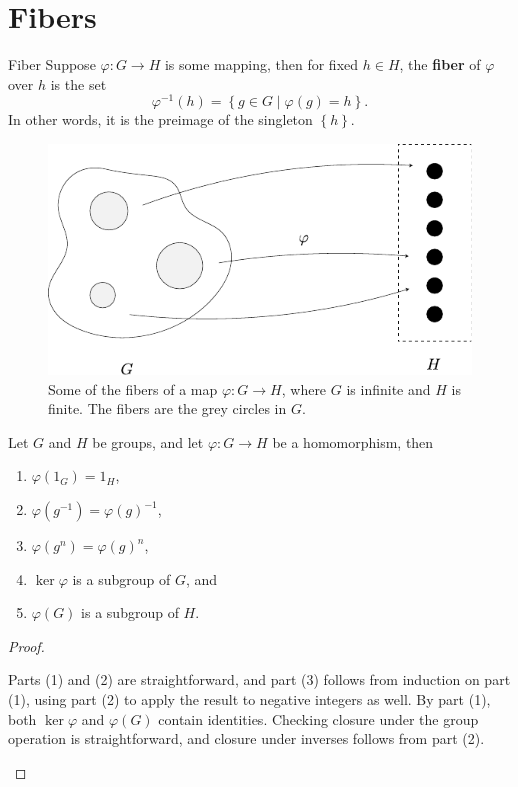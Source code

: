 \documentclass[10pt]{report}
\begin{document}

\section{Fibers}

\begin{defn}{Fiber}{}
	Suppose $\varphi:G\to H$ is some mapping, then for fixed $h\in H$, the \textbf{fiber} of $\varphi$ over $h$ is the set
	\[
		\varphi^{-1}(h) = \left\{ g\in G \;|\; \varphi(g) = h \right\}.
	\] In other words, it is the preimage of the singleton $\left\{ h \right\}$.
\end{defn}

\begin{figure}[H]
	\centering
	\includegraphics[scale=1]{fig/fibers.pdf}
	\caption{Some of the fibers of a map $\varphi:G\to H$, where $G$ is infinite and $H$ is finite. The fibers are the grey circles in $G$.}
\end{figure}

\begin{prop}
Let $G$ and $H$ be groups, and let $\varphi:G\to H$ be a homomorphism, then
\begin{enumerate}
	\item $\varphi(1_G)=1_H$,
	\item $\varphi(g^{-1}) = \varphi(g)^{-1}$,
	\item $\varphi(g^n) = \varphi(g)^n$,
	\item $\ker \varphi$ is a subgroup of $G$, and
	\item $\varphi(G)$ is a subgroup of $H$.
\end{enumerate}
\end{prop}
\begin{proof}
	\begin{enumerate}
		Parts (1) and (2) are straightforward, and part (3) follows from induction on part (1), using part (2) to apply the result to negative integers as well. By part (1), both $\ker \varphi$ and $\varphi(G)$ contain identities. Checking closure under the group operation is straightforward, and closure under inverses follows from part (2).
	\end{enumerate}
\end{proof}
\end{document}
